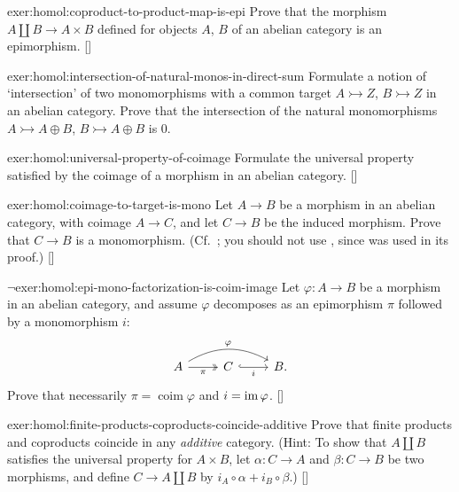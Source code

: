 \begin{exer}{}{exer:homol:coproduct-to-product-map-is-epi}
  \exerused{} Prove that the morphism $A \amalg B \to A \times B$
  defined for objects $A$, $B$ of an abelian category is an
  epimorphism. []
\end{exer}
\begin{exer}{}{exer:homol:intersection-of-natural-monos-in-direct-sum}
  Formulate a notion of `intersection' of two monomorphisms with a
  common target $A \rightarrowtail Z$, $B \rightarrowtail Z$ in an
  abelian category. Prove that the intersection of the natural
  monomorphisms $A \rightarrowtail A \oplus B$,
  $B \rightarrowtail A \oplus B$ is $0$.
\end{exer}
\begin{exer}{}{exer:homol:universal-property-of-coimage}
  \exerused{} Formulate the universal property satisfied by the
  coimage of a morphism in an abelian
  category. []
\end{exer}
\begin{exer}{}{exer:homol:coimage-to-target-is-mono}
  \exerused{} Let $A \to B$ be a morphism in an abelian category, with
  coimage $A \to C$, and let $C \to B$ be the induced morphism. Prove
  that $C \to B$ is a monomorphism. (Cf.\ ; you
  should not use , since
   was used in its proof.)
  []
\end{exer}
\begin{exer}{$\lnot$}{exer:homol:epi-mono-factorization-is-coim-image}
  Let $\varphi : A \to B$ be a morphism in an abelian category, and
  assume $\varphi$ decomposes as an epimorphism $\pi$ followed by a
  monomorphism $i$:
  \[\begin{tikzcd}
      A \arrow[r, two heads, "\pi"'] \arrow[rr, bend left, "\varphi"]
      & C \arrow[r, hook, "i"'] & B.
    \end{tikzcd}\] Prove that necessarily
  $\pi = \operatorname{coim}\varphi$ and $i =
  \operatorname{im}\varphi$. []
\end{exer}
\begin{exer}{}{exer:homol:finite-products-coproducts-coincide-additive}
  \exerused{} Prove that finite products and coproducts coincide in
  any \emph{additive} category. (Hint: To show that $A \amalg B$
  satisfies the universal property for $A \times B$, let
  $\alpha : C \to A$ and $\beta : C \to B$ be two morphisms, and
  define $C \to A \amalg B$ by $i_A \circ \alpha + i_B \circ \beta$.)
  []
\end{exer}

